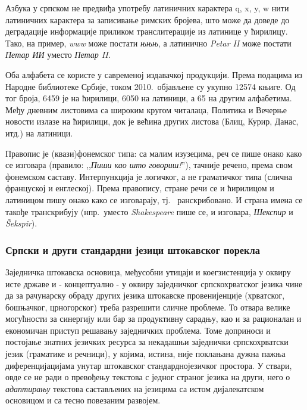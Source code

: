 \begin{multicols}{2}
Азбука у српском не предвиђа употребу латиничних карактера q, x, y, w нити латиничних карактера за записивање римских бројева, што може да доведе до деградације информације приликом транслитерације из латинице у ћирилицу. Тако, на пример, \textit{www} може постати \textit{њњњ}, а латинично \textit{Petar II} може постати \textit{Петар ИИ} уместо \textit{Петар II}. 

Оба алфабета се користе у савременој издавачкој продукцији. Према подацима из Народне библиотеке Србије, током 2010.~објављене су укупно 12574 књиге. Од тог броја, 6459 је на ћирилици, 6050 на латиници, а 65 на другим алфабетима. Међу дневним листовима са широким кругом читалаца, Политика и Вечерње новости излазе на ћирилици, док је већина других листова (Блиц, Курир, Данас, итд.) на латиници. 

Правопис је (квази)фонемског типа: са малим изузецима, реч се пише онако како се изговара (правило: ,,\textit{Пиши као што говориш!}''), тачније речено, према свом фонемском саставу.
Интерпункција је логичког, а не граматичког типа (слична француској и енглеској).
Према правопису, стране речи се и ћирилицом и латиницом пишу онако како се изговарају, тј. ~ранскрибовано. И страна имена се такође транскрибују (нпр.~уместо \textit{Shakespeare} пише се, и изговара, \textit{Шекспир} и \textit{Šekspir}).

\subsubsection {Српски и други стандардни језици штокавског порекла}
  
Заједничка штокавска основица, међусобни утицаји и коегзистенција у оквиру исте државе и - концептуално - у оквиру заједничког српскохрватског језика чине да за рачунарску обраду других језика  штокавске провенијенције (хрватског, бошњачког, црногорског) треба разрешити сличне проблеме. То отвара велике могућности за синергију или бар за продуктивну сарадњу, као и за  рационалан и економичан приступ решавању заједничких проблема. Томе доприноси и постојање знатних језичких ресурса за некадашњи заједнички српскохрватски језик (граматике и речници), у којима, истина, није поклањана дуж\-на пажња диференцијацијама унутар штокавског стандарднојезичког простора. У ствари, овде се не ради о превођењу текстова с једног страног језика на други, него о \textit{адаптирању} текстова састављених на језицима са истом дијалекатском основицом и са тесно повезаним развојем. 


\end{multicols}
